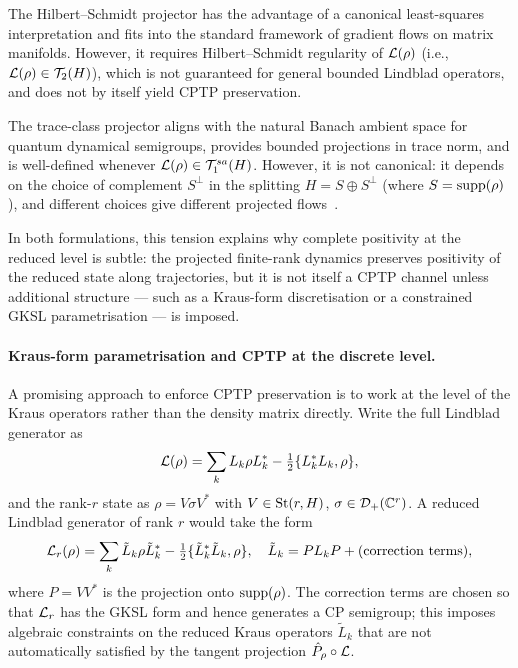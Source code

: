 The Hilbert--Schmidt projector has the advantage of a canonical
least-squares interpretation and fits into the standard framework of
gradient flows on matrix manifolds. However, it requires Hilbert--Schmidt
regularity of $\mathcal{L}(\rho)$ (i.e., $\mathcal{L}(\rho) \in \mathcal{T}_{2}(H)$),
which is not guaranteed for general bounded Lindblad operators, and
does not by itself yield CPTP preservation.

The trace-class projector aligns with the natural Banach ambient space
for quantum dynamical semigroups, provides bounded projections in trace
norm, and is well-defined whenever $\mathcal{L}(\rho) \in \mathcal{T}_{1}^{sa}(H)$.
However, it is not canonical: it depends on the choice of complement
$S^\perp$ in the splitting $H = S \oplus S^\perp$ (where
$S = \mathrm{supp}(\rho)$), and different choices give different projected
flows~\cite{AcevedoFalco2026}.

In both formulations, this tension explains why complete positivity at
the reduced level is subtle: the projected finite-rank dynamics preserves
positivity of the reduced state along trajectories, but it is not itself
a CPTP channel unless additional structure — such as a Kraus-form
discretisation or a constrained GKSL parametrisation — is imposed.

\paragraph{Kraus-form parametrisation and CPTP at the discrete level.}
A promising approach to enforce CPTP preservation is to work at the
level of the Kraus operators rather than the density matrix directly.
Write the full Lindblad generator as
\begin{equation}
    \mathcal{L}(\rho) = \sum_k L_k \rho L_k^* - \tfrac{1}{2}\{L_k^* L_k, \rho\},
\end{equation}
and the rank-$r$ state as $\rho = V\sigma V^*$ with $V \in \mathrm{St}(r,H)$,
$\sigma \in \mathcal{D}_+(\mathbb{C}^r)$. A reduced Lindblad generator of rank $r$
would take the form
\begin{equation}
    \mathcal{L}_r(\rho) = \sum_k \tilde{L}_k \rho \tilde{L}_k^*
    - \tfrac{1}{2}\{\tilde{L}_k^* \tilde{L}_k, \rho\},
    \quad \tilde{L}_k = P L_k P + (\text{correction terms}),
\end{equation}
where $P = VV^*$ is the projection onto $\mathrm{supp}(\rho)$.
The correction terms are chosen so that $\mathcal{L}_r$ has the GKSL form
and hence generates a CP semigroup; this imposes algebraic constraints
on the reduced Kraus operators $\tilde{L}_k$ that are not automatically
satisfied by the tangent projection $\hat{P}_\rho \circ \mathcal{L}$.

